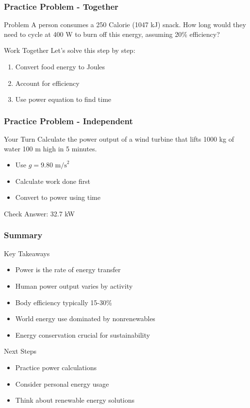 \documentclass{beamer}
\begin{document}
\begin{frame}
\frametitle{Practice Problem - Together}
\begin{block}{Problem}
A person consumes a 250 Calorie (1047 kJ) snack. How long would they need to cycle at 400 W to burn off this energy, assuming 20\% efficiency?
\end{block}
\pause

\begin{block}{Work Together}
Let's solve this step by step:
\begin{enumerate}
\item Convert food energy to Joules
\item Account for efficiency
\item Use power equation to find time
\end{enumerate}
\end{block}
\end{frame}

\begin{frame}
\frametitle{Practice Problem - Independent}
\begin{block}{Your Turn}
Calculate the power output of a wind turbine that lifts 1000 kg of water 100 m high in 5 minutes.
\begin{itemize}
\item Use $g = 9.80\text{ m/s}^2$
\item Calculate work done first
\item Convert to power using time
\end{itemize}
\end{block}

\pause

\begin{block}{Check}
Answer: 32.7 kW
\end{block}
\end{frame}

\begin{frame}
\frametitle{Summary}
\begin{block}{Key Takeaways}
\begin{itemize}
\item Power is the rate of energy transfer
\item Human power output varies by activity
\item Body efficiency typically 15-30\%
\item World energy use dominated by nonrenewables
\item Energy conservation crucial for sustainability
\end{itemize}
\end{block}
\begin{block}{Next Steps}
\begin{itemize}
\item Practice power calculations
\item Consider personal energy usage
\item Think about renewable energy solutions
\end{itemize}
\end{block}
\end{frame}
\end{document}
